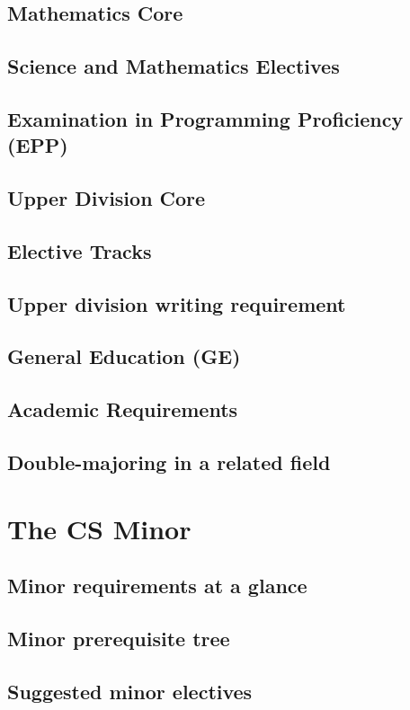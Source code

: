 \documentclass{book}
\begin{document}
\section{Mathematics Core}
\section{Science and Mathematics Electives}
\section{Examination in Programming Proficiency (EPP)}
\section{Upper Division Core}
\section{Elective Tracks}
\section{Upper division writing requirement}
\section{General Education (GE)}
\section{Academic Requirements}
\section{Double-majoring in a related field}

\chapter{The CS Minor}

\section{Minor requirements at a glance}
\section{Minor prerequisite tree}
\section{Suggested minor electives}
\end{document}
